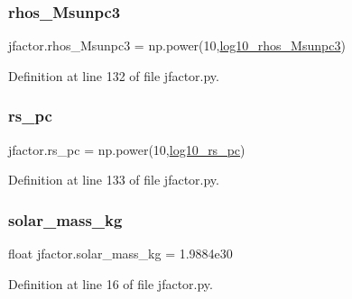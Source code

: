 \mbox{\label{namespacejfactor_aa9f6835eba853a5bb2b380ad7fb87010}} 
\subsubsection{\texorpdfstring{rhos\+\_\+\+Msunpc3}{rhos\_Msunpc3}}
{\footnotesize\ttfamily jfactor.\+rhos\+\_\+\+Msunpc3 = np.\+power(10,\hyperlink{namespacejfactor_af2c2b0ba5a6685424721abec6152e28d}{log10\+\_\+rhos\+\_\+\+Msunpc3})}



Definition at line 132 of file jfactor.\+py.

\mbox{\label{namespacejfactor_ae602db7ab45f472ad4007d04def859f7}} 
\subsubsection{\texorpdfstring{rs\+\_\+pc}{rs\_pc}}
{\footnotesize\ttfamily jfactor.\+rs\+\_\+pc = np.\+power(10,\hyperlink{namespacejfactor_a3102b0936ba8da6d8f0bf7044cd1aa7c}{log10\+\_\+rs\+\_\+pc})}



Definition at line 133 of file jfactor.\+py.

\mbox{\label{namespacejfactor_a30f254edbd584a30535a1b98c2916563}} 
\subsubsection{\texorpdfstring{solar\+\_\+mass\+\_\+kg}{solar\_mass\_kg}}
{\footnotesize\ttfamily float jfactor.\+solar\+\_\+mass\+\_\+kg = 1.\+9884e30}



Definition at line 16 of file jfactor.\+py.

